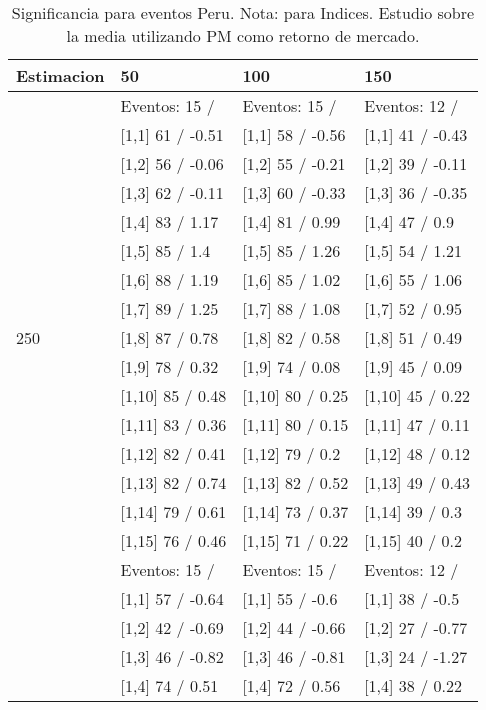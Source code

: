 \begin{table}

\caption{Significancia para eventos Peru. Nota: para Indices. Estudio sobre la media utilizando PM como retorno de mercado.}
\centering
\begin{tabular}[t]{llll}
\toprule
Estimacion & 50 & 100 & 150\\
\midrule
 & Eventos:  15 / & Eventos:  15 / & Eventos:  12 /\\
 & {}[1,1] 61  / -0.51 & {}[1,1] 58  / -0.56 & {}[1,1] 41  / -0.43\\
 & {}[1,2] 56  / -0.06 & {}[1,2] 55  / -0.21 & {}[1,2] 39  / -0.11\\
 & {}[1,3] 62  / -0.11 & {}[1,3] 60  / -0.33 & {}[1,3] 36  / -0.35\\
 & {}[1,4] 83  / 1.17 & {}[1,4] 81  / 0.99 & {}[1,4] 47  / 0.9\\
\addlinespace
 & {}[1,5] 85  / 1.4 & {}[1,5] 85  / 1.26 & {}[1,5] 54  / 1.21\\
 & {}[1,6] 88  / 1.19 & {}[1,6] 85  / 1.02 & {}[1,6] 55  / 1.06\\
 & {}[1,7] 89  / 1.25 & {}[1,7] 88  / 1.08 & {}[1,7] 52  / 0.95\\
250 & {}[1,8] 87  / 0.78 & {}[1,8] 82  / 0.58 & {}[1,8] 51  / 0.49\\
 & {}[1,9] 78  / 0.32 & {}[1,9] 74  / 0.08 & {}[1,9] 45  / 0.09\\
\addlinespace
 & {}[1,10] 85  / 0.48 & {}[1,10] 80  / 0.25 & {}[1,10] 45  / 0.22\\
 & {}[1,11] 83  / 0.36 & {}[1,11] 80  / 0.15 & {}[1,11] 47  / 0.11\\
 & {}[1,12] 82  / 0.41 & {}[1,12] 79  / 0.2 & {}[1,12] 48  / 0.12\\
 & {}[1,13] 82  / 0.74 & {}[1,13] 82  / 0.52 & {}[1,13] 49  / 0.43\\
 & {}[1,14] 79  / 0.61 & {}[1,14] 73  / 0.37 & {}[1,14] 39  / 0.3\\
\addlinespace
 & {}[1,15] 76  / 0.46 & {}[1,15] 71  / 0.22 & {}[1,15] 40  / 0.2\\
 & Eventos:  15 / & Eventos:  15 / & Eventos:  12 /\\
 & {}[1,1] 57  / -0.64 & {}[1,1] 55  / -0.6 & {}[1,1] 38  / -0.5\\
 & {}[1,2] 42  / -0.69 & {}[1,2] 44  / -0.66 & {}[1,2] 27  / -0.77\\
 & {}[1,3] 46  / -0.82 & {}[1,3] 46  / -0.81 & {}[1,3] 24  / -1.27\\
\addlinespace
 & {}[1,4] 74  / 0.51 & {}[1,4] 72  / 0.56 & {}[1,4] 38  / 0.22\\

\end{tabular}
\end{table}
